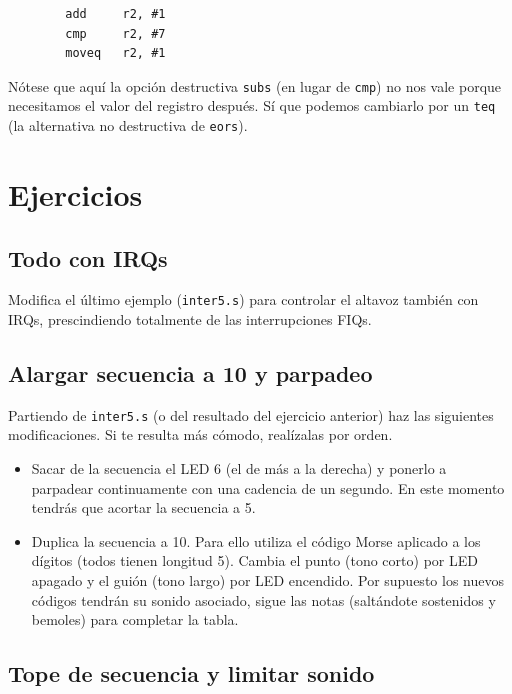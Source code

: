 \begin{lstlisting}
        add     r2, #1
        cmp     r2, #7
        moveq   r2, #1
\end{lstlisting}

Nótese que aquí la opción destructiva {\tt subs} (en lugar de {\tt cmp}) no nos vale porque
necesitamos el valor del registro después. Sí que podemos cambiarlo por un {\tt teq} (la
alternativa no destructiva de {\tt eors}).

\section{Ejercicios}

\subsection{Todo con IRQs}

Modifica el último ejemplo ({\tt inter5.s}) para controlar el altavoz también con IRQs,
prescindiendo totalmente de las interrupciones FIQs.

\subsection{Alargar secuencia a 10 y parpadeo}

Partiendo de {\tt inter5.s} (o del resultado del ejercicio anterior) haz las siguientes
modificaciones. Si te resulta más cómodo, realízalas por orden.

\begin{itemize}
  \item Sacar de la secuencia el LED 6 (el de más a la derecha) y ponerlo a parpadear
        continuamente con una cadencia de un segundo. En este momento tendrás que acortar
        la secuencia a 5.
  \item Duplica la secuencia a 10. Para ello utiliza el código Morse aplicado a los dígitos
        (todos tienen longitud 5). Cambia el punto (tono corto) por LED apagado y el guión
        (tono largo) por LED encendido. Por supuesto los nuevos códigos tendrán su sonido
        asociado, sigue las notas (saltándote sostenidos y bemoles) para completar la tabla.
\end{itemize}

\subsection{Tope de secuencia y limitar sonido}


